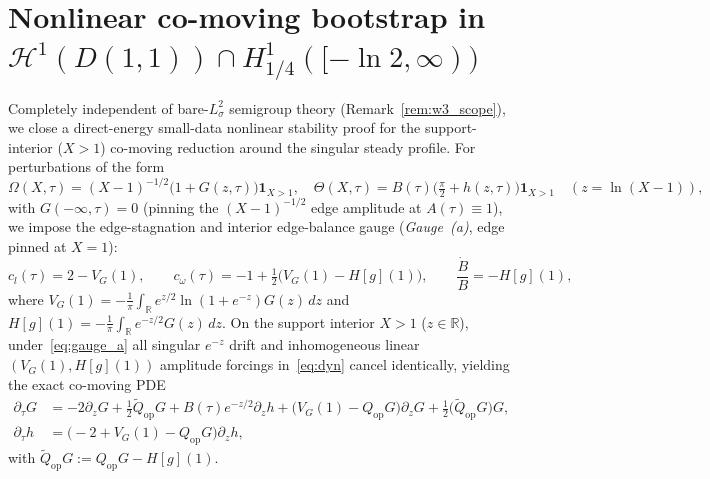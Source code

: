 \documentclass[11pt,a4paper]{article}
\begin{document}
\section{Nonlinear co-moving bootstrap in $\mathcal{H}^1(D(1,1))\cap H^1_{1/4}([-\ln 2,\infty))$}
\label{sec:nonlin_bootstrap}

Completely independent of bare-$L^2_\sigma$ semigroup theory (Remark~\ref{rem:w3_scope}), we
close a direct-energy small-data nonlinear stability proof for the support-interior ($X>1$)
co-moving reduction around the singular steady profile.  For perturbations of the form
\[
\Omega(X,\tau) = (X-1)^{-1/2}\bigl(1+G(z,\tau)\bigr)\mathbf{1}_{X>1}, \quad
\Theta(X,\tau) = B(\tau)\bigl(\tfrac{\pi}{2}+h(z,\tau)\bigr)\mathbf{1}_{X>1} \quad (z=\ln(X-1)),
\]
with $G(-\infty,\tau)=0$ (pinning the $(X-1)^{-1/2}$ edge amplitude at $A(\tau)\equiv 1$),
we impose the edge-stagnation and interior edge-balance gauge (\emph{Gauge~(a)}, edge pinned at $X=1$):
\begin{equation}\label{eq:gauge_a}
c_l(\tau) = 2 - V_G(1), \qquad
c_\omega(\tau) = -1 + \tfrac{1}{2}\bigl(V_G(1) - H[g](1)\bigr), \qquad
\frac{\dot B}{B} = -H[g](1),
\end{equation}
where $V_G(1) = -\frac{1}{\pi}\int_{\mathbb{R}} e^{z/2}\ln(1+e^{-z})G(z)\,dz$ and
$H[g](1) = -\frac{1}{\pi}\int_{\mathbb{R}} e^{-z/2}G(z)\,dz$.
On the support interior $X>1$ ($z\in\mathbb{R}$), under~\eqref{eq:gauge_a} all singular $e^{-z}$
drift and inhomogeneous linear $(V_G(1), H[g](1))$ amplitude forcings in~\eqref{eq:dyn} cancel
identically, yielding the exact co-moving PDE
\begin{equation}\label{eq:comoving_exact}
\begin{aligned}
\partial_\tau G &= -2\partial_z G + \tfrac{1}{2}\widetilde{Q}_{\mathrm{op}}G + B(\tau)e^{-z/2}\partial_z h
  + \bigl(V_G(1) - Q_{\mathrm{op}}G\bigr)\partial_z G + \tfrac{1}{2}\bigl(\widetilde{Q}_{\mathrm{op}}G\bigr)G, \\
\partial_\tau h &= \bigl(-2 + V_G(1) - Q_{\mathrm{op}}G\bigr)\partial_z h,
\end{aligned}
\end{equation}
with $\widetilde{Q}_{\mathrm{op}}G := Q_{\mathrm{op}}G - H[g](1)$.
\end{document}
